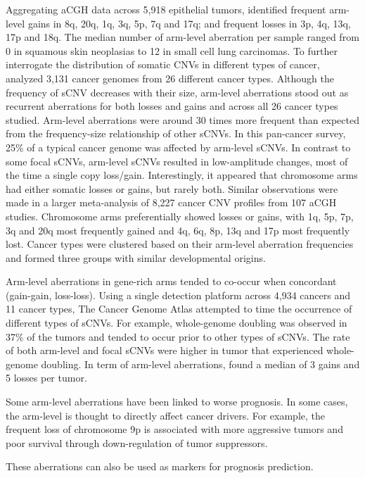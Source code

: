Aggregating aCGH data across 5,918 epithelial tumors, \citet{Baudis2007} identified frequent arm-level gains in 8q, 20q, 1q, 3q, 5p, 7q and 17q; and frequent losses in 3p, 4q, 13q, 17p and 18q.
The median number of arm-level aberration per sample ranged from 0 in squamous skin neoplasias to 12 in small cell lung carcinomas\cite{Baudis2007}.
To further interrogate the distribution of somatic CNVs in different types of cancer, \citet{Beroukhim2010} analyzed 3,131 cancer genomes from 26 different cancer types.
Although the frequency of sCNV decreases with their size, arm-level aberrations stood out as recurrent aberrations for both losses and gains and across all 26 cancer types studied.
Arm-level aberrations were around 30 times more frequent than expected from the frequency-size relationship of other sCNVs.
In this pan-cancer survey, 25\% of a typical cancer genome was affected by arm-level sCNVs.
In contrast to some focal sCNVs, arm-level sCNVs resulted in low-amplitude changes, most of the time a single copy loss/gain.
Interestingly, it appeared that chromosome arms had either somatic losses or gains, but rarely both.
Similar observations were made in a larger meta-analysis of 8,227 cancer CNV profiles from 107 aCGH studies\cite{Kim2013b}.
Chromosome arms preferentially showed losses or gains, with 1q, 5p, 7p, 3q and 20q most frequently gained and 4q, 6q, 8p, 13q and 17p most frequently lost.
Cancer types were clustered based on their arm-level aberration frequencies and formed three groups with similar developmental origins.
\begin{comment}
  Five cancer of hematologic-origin clustered together; most of the epithelial cancers formed the second cluster; the third cluster contained four neuroepithelial cancers as well as sarcoma and RCC.
\end{comment}
Arm-level aberrations in gene-rich arms tended to co-occur when concordant (gain-gain, loss-loss)\cite{Kim2013b}.
Using a single detection platform across 4,934 cancers and 11 cancer types, The Cancer Genome Atlas attempted to time the occurrence of different types of sCNVs\cite{Zack2013}.
For example, whole-genome doubling was observed in 37\% of the tumors and tended to occur prior to other types of sCNVs.
The rate of both arm-level and focal sCNVs were higher in tumor that experienced whole-genome doubling.
In term of arm-level aberrations, \citet{Zack2013} found a median of 3 gains and 5 losses per tumor.

Some arm-level aberrations have been linked to worse prognosis\cite{Jen1994,Roy2016}.
In some cases, the arm-level is thought to directly affect cancer drivers.
For example, the frequent loss of chromosome 9p is associated with more aggressive tumors and poor survival through down-regulation of tumor suppressors\cite{Roy2016}.
\begin{comment}
  Loss of chromosome 9p is associated with poor prognosis across many cancers although the identification of driver genes was performed on low-grade gliomas.
\end{comment}
These aberrations can also be used as markers for prognosis prediction.

